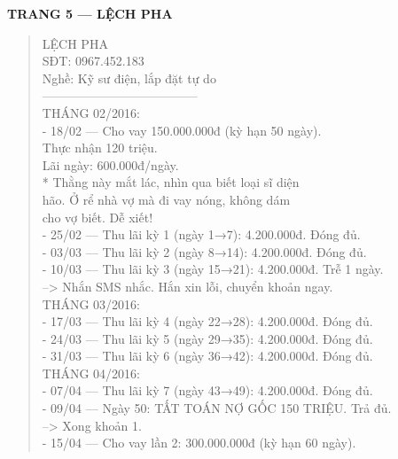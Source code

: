 \documentclass[12pt,a4paper]{article}
\begin{document}
\vspace{0.35cm}\noindent\textbf{\large TRANG 5 — LỆCH PHA}\\[0.15cm]



\begin{quote}
\fontsize{9pt}{11pt}\selectfont\ttfamily
LỆCH PHA\\
SĐT: 0967.452.183\\
Nghề: Kỹ sư điện, lắp đặt tự do\\
--------------------------------------\\
\vspace{0.2cm}
THÁNG 02/2016:\\
- 18/02 --- Cho vay 150.000.000đ (kỳ hạn 50 ngày).\\
          Thực nhận 120 triệu.\\
          Lãi ngày: 600.000đ/ngày.\\
          * Thằng này mắt lác, nhìn qua biết loại sĩ diện\\
            hão. Ở rể nhà vợ mà đi vay nóng, không dám\\
            cho vợ biết. Dễ xiết!\\
\vspace{0.2cm}
- 25/02 --- Thu lãi kỳ 1 (ngày 1→7): 4.200.000đ. Đóng đủ.\\
- 03/03 --- Thu lãi kỳ 2 (ngày 8→14): 4.200.000đ. Đóng đủ.\\
- 10/03 --- Thu lãi kỳ 3 (ngày 15→21): 4.200.000đ. Trễ 1 ngày.\\
          --> Nhắn SMS nhắc. Hắn xin lỗi, chuyển khoản ngay.\\
\vspace{0.2cm}
THÁNG 03/2016:\\
- 17/03 --- Thu lãi kỳ 4 (ngày 22→28): 4.200.000đ. Đóng đủ.\\
- 24/03 --- Thu lãi kỳ 5 (ngày 29→35): 4.200.000đ. Đóng đủ.\\
- 31/03 --- Thu lãi kỳ 6 (ngày 36→42): 4.200.000đ. Đóng đủ.\\
\vspace{0.2cm}
THÁNG 04/2016:\\
- 07/04 --- Thu lãi kỳ 7 (ngày 43→49): 4.200.000đ. Đóng đủ.\\
- 09/04 --- Ngày 50: TẤT TOÁN NỢ GỐC 150 TRIỆU. Trả đủ.\\
          --> Xong khoản 1.\\
\vspace{0.2cm}
- 15/04 --- Cho vay lần 2: 300.000.000đ (kỳ hạn 60 ngày).\\

\end{quote}
\end{document}
